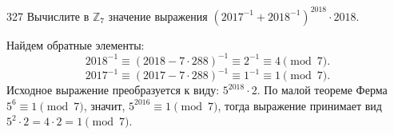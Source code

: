\begin{task}{327}
Вычислите в $\mathds{Z}_7$ значение выражения $(2017^{-1} + 2018^{-1})^{2018}\cdot 2018$.
\end{task}
\begin{solution}
Найдем обратные элементы:
\[2018^{-1} \equiv (2018-7\cdot 288)^{-1} \equiv 2^{-1} \equiv 4 \pmod{7}.\]
\[2017^{-1} \equiv (2017-7\cdot 288)^{-1} \equiv 1^{-1} \equiv 1 \pmod{7}.\]
Исходное выражение преобразуется к виду: $5^{2018}\cdot 2$. По малой теореме Ферма $5^6 \equiv 1 \pmod{7}$, значит, $5^{2016} \equiv 1 \pmod{7}$, тогда выражение принимает вид $5^2\cdot 2 = 4\cdot 2 = 1 \pmod{7}$.
\end{solution}
